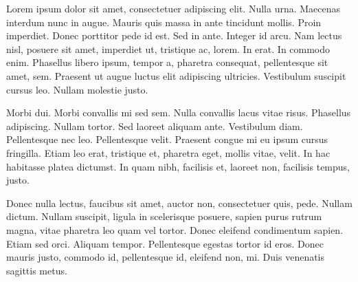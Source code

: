 \documentclass{article}
\begin{document}
\listoftodos

Lorem ipsum dolor sit amet, consectetuer adipiscing elit. Nulla
%
urna. Maecenas interdum nunc in augue. Mauris quis massa in ante
tincidunt mollis. Proin imperdiet. Donec porttitor pede id est. Sed
in ante. Integer id arcu. Nam lectus nisl, posuere sit amet,
imperdiet ut, tristique ac, lorem. In erat. In commodo enim.
%
Phasellus libero ipsum, tempor a, pharetra consequat, pellentesque
sit amet, sem. Praesent ut augue luctus elit adipiscing ultricies.
Vestibulum suscipit cursus leo. Nullam molestie justo.


Morbi dui. Morbi convallis mi sed sem. Nulla convallis lacus vitae
risus. Phasellus adipiscing. Nullam tortor. Sed laoreet aliquam
ante. Vestibulum diam. Pellentesque nec leo. Pellentesque velit.
%
Praesent congue mi eu ipsum cursus fringilla. Etiam leo erat,
tristique et, pharetra eget, mollis vitae, velit. In hac habitasse
%
platea dictumst. In quam nibh, facilisis et, laoreet non, facilisis
tempus, justo.


Donec nulla lectus, faucibus sit amet, auctor non, consectetuer
quis, pede. Nullam dictum. Nullam suscipit, ligula in scelerisque
%
posuere, sapien purus rutrum magna, vitae pharetra leo quam vel
tortor. Donec eleifend condimentum sapien. Etiam sed orci. Aliquam
%
tempor. Pellentesque egestas tortor id eros. Donec mauris justo,
commodo id, pellentesque id, eleifend non, mi. Duis venenatis
sagittis metus. 
\end{document}
